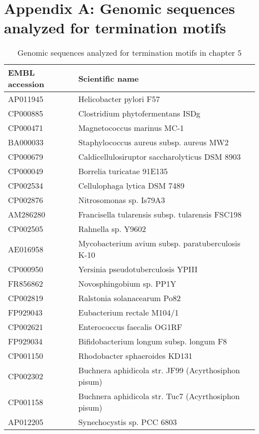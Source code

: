 \chapter{Appendix A: Genomic sequences analyzed for termination motifs}
\ifpdf
    \graphicspath{{AppendixA/AppendixAFigs/EPS/}{AppendixA/AppendixAFigs/}}
\fi

\begingroup
  \centering
     \tiny
   \noindent
  \begin{longtable}{ll}
  \caption{Genomic sequences analyzed for termination motifs in chapter 5}   
  \\ 
    \toprule
    \textbf{EMBL accession} & \textbf{Scientific name} \\
    \midrule
AP011945 & Helicobacter pylori F57\\
CP000885 & Clostridium phytofermentans ISDg\\
CP000471 & Magnetococcus marinus MC-1\\
BA000033 & Staphylococcus aureus subsp. aureus MW2\\
CP000679 & Caldicellulosiruptor saccharolyticus DSM 8903\\
CP000049 & Borrelia turicatae 91E135\\
CP002534 & Cellulophaga lytica DSM 7489\\
CP002876 & Nitrosomonas sp. Is79A3\\
AM286280 & Francisella tularensis subsp. tularensis FSC198\\
CP002505 & Rahnella sp. Y9602\\
AE016958 & Mycobacterium avium subsp. paratuberculosis K-10\\
CP000950 & Yersinia pseudotuberculosis YPIII\\
FR856862 & Novosphingobium sp. PP1Y\\
CP002819 & Ralstonia solanacearum Po82\\
FP929043 & Eubacterium rectale M104/1\\
CP002621 & Enterococcus faecalis OG1RF\\
FP929034 & Bifidobacterium longum subsp. longum F8\\
CP001150 & Rhodobacter sphaeroides KD131\\
CP002302 & Buchnera aphidicola str. JF99 (Acyrthosiphon pisum)\\
CP001158 & Buchnera aphidicola str. Tuc7 (Acyrthosiphon pisum)\\
AP012205 & Synechocystis sp. PCC 6803\\

\end{longtable}

